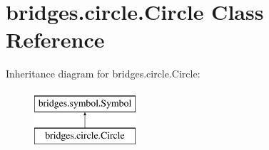\hypertarget{classbridges_1_1circle_1_1_circle}{}\section{bridges.\+circle.\+Circle Class Reference}
\label{classbridges_1_1circle_1_1_circle}
Inheritance diagram for bridges.\+circle.\+Circle\+:\begin{figure}[H]
\begin{center}
\leavevmode
\includegraphics[height=2.000000cm]{classbridges_1_1circle_1_1_circle}
\end{center}
\end{figure}
